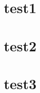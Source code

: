 \documentclass{beamer}
\begin{document}
\begin{frame}
\end{frame}

\section{test1}
\begin{frame}
\end{frame}

\section{test2}
\begin{frame}
\end{frame}

\section{test3}
\begin{frame}
\end{frame}
\end{document}
